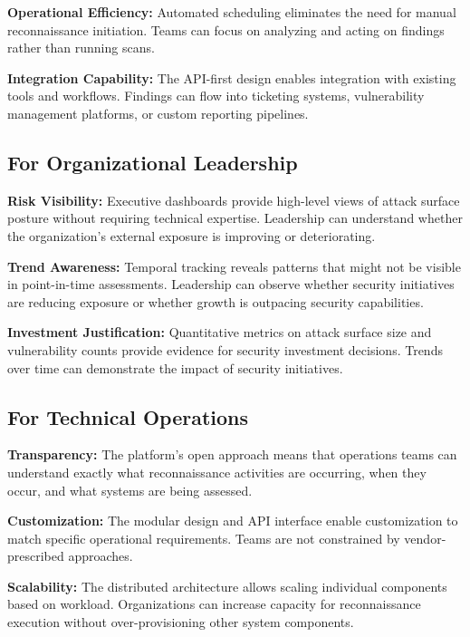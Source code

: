\documentclass[a4paper,12pt]{report}
\begin{document}
\textbf{Operational Efficiency:} Automated scheduling eliminates the need for manual reconnaissance initiation. Teams can focus on analyzing and acting on findings rather than running scans.\hfill \break

\textbf{Integration Capability:} The API-first design enables integration with existing tools and workflows. Findings can flow into ticketing systems, vulnerability management platforms, or custom reporting pipelines.\hfill \break

\subsection{For Organizational Leadership}

\textbf{Risk Visibility:} Executive dashboards provide high-level views of attack surface posture without requiring technical expertise. Leadership can understand whether the organization's external exposure is improving or deteriorating.\hfill \break

\textbf{Trend Awareness:} Temporal tracking reveals patterns that might not be visible in point-in-time assessments. Leadership can observe whether security initiatives are reducing exposure or whether growth is outpacing security capabilities.\hfill \break

\textbf{Investment Justification:} Quantitative metrics on attack surface size and vulnerability counts provide evidence for security investment decisions. Trends over time can demonstrate the impact of security initiatives.\hfill \break

\subsection{For Technical Operations}

\textbf{Transparency:} The platform's open approach means that operations teams can understand exactly what reconnaissance activities are occurring, when they occur, and what systems are being assessed.\hfill \break

\textbf{Customization:} The modular design and API interface enable customization to match specific operational requirements. Teams are not constrained by vendor-prescribed approaches.\hfill \break

\textbf{Scalability:} The distributed architecture allows scaling individual components based on workload. Organizations can increase capacity for reconnaissance execution without over-provisioning other system components.\hfill \break
\end{document}
